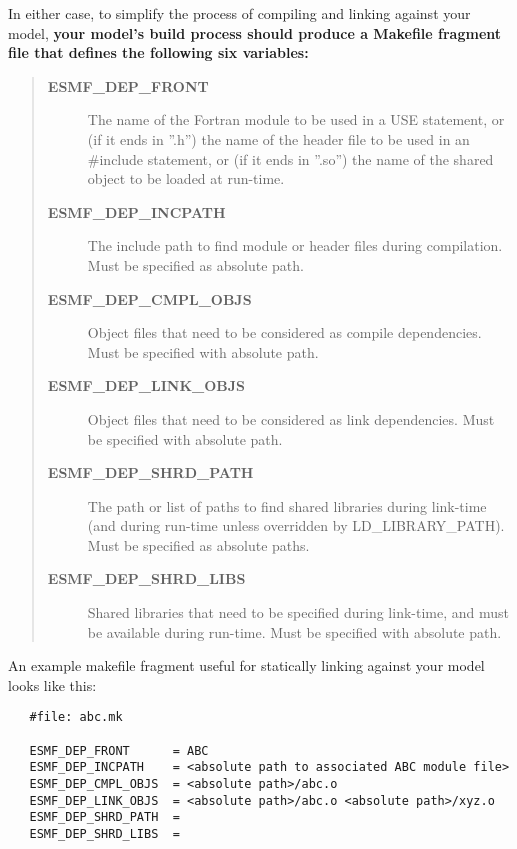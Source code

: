 In either case, to simplify the process of compiling and linking against
your model, \textbf{your model's build process should produce a Makefile fragment file
that defines the following six variables:}
\begin{quote}
\begin{description}
\item[{\textbf{ESMF\_DEP\_FRONT}}] \leavevmode
The name of the Fortran module to be used in a USE statement,
or (if it ends in ''.h'') the name of the header file to be used
in an \#include statement, or (if it ends in ''.so'') the name of
the shared object to be loaded at run-time.

\item[{\textbf{ESMF\_DEP\_INCPATH}}] \leavevmode
The include path to find module or header files during compilation. Must be specified as absolute path.

\item[{\textbf{ESMF\_DEP\_CMPL\_OBJS}}] \leavevmode
Object files that need to be considered as compile dependencies. Must be specified with absolute path.

\item[{\textbf{ESMF\_DEP\_LINK\_OBJS}}] \leavevmode
Object files that need to be considered as link dependencies. Must be specified with absolute path.

\item[{\textbf{ESMF\_DEP\_SHRD\_PATH}}] \leavevmode
The path or list of paths to find shared libraries during link-time (and during run-time unless overridden by LD\_LIBRARY\_PATH). Must be specified as absolute paths.

\item[{\textbf{ESMF\_DEP\_SHRD\_LIBS}}] \leavevmode
Shared libraries that need to be specified during link-time, and must be available during run-time. Must be specified with absolute path.

\end{description}
\end{quote}

An example makefile fragment useful for statically linking against your model looks like this:

\begin{verbatim}
   #file: abc.mk
 
   ESMF_DEP_FRONT      = ABC
   ESMF_DEP_INCPATH    = <absolute path to associated ABC module file>
   ESMF_DEP_CMPL_OBJS  = <absolute path>/abc.o
   ESMF_DEP_LINK_OBJS  = <absolute path>/abc.o <absolute path>/xyz.o
   ESMF_DEP_SHRD_PATH  = 
   ESMF_DEP_SHRD_LIBS  =
\end{verbatim}


